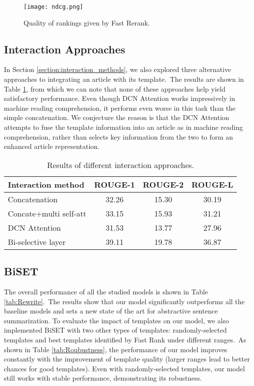 \documentclass[11pt,a4paper]{article}
\begin{document}
\begin{spacing}{1.0}
\begin{figure}
\centering
\texttt{[image: ndcg.png]}
\caption{Quality of rankings given by Fast Rerank.}
\label{img:ndcg}
\end{figure}


\subsection{Interaction Approaches}
In Section \ref{section:interaction_methods}, we also explored three alternative approaches to integrating an article with its template.~The results are shown in Table \ref{tab:Interaction}, from which we can note that none of these approaches help yield satisfactory performance. Even though DCN Attention works impressively in machine reading comprehension, it performs even worse in this task than the simple concatenation. We conjecture the reason is that the DCN Attention attempts to fuse the template information into an article as in machine reading comprehension, rather than  selects key information from the two to form an enhanced article representation.

\begin{table}[h]
\small

	\centering
	\begin{tabular}{@{}l|ccc@{}}
		\toprule
        Interaction method& ROUGE-1   & ROUGE-2  & ROUGE-L  \\
        \hline
        Concatenation  & 32.26 & 15.30 & 30.19 \\
        Concate+multi self-att  & 33.15 & 15.93 & 31.21 \\
        DCN Attention   & 31.53 & 13.77 & 27.96 \\
        Bi-selective layer &39.11 & 19.78 & 36.87 \\
        \bottomrule
	\end{tabular}
	\caption{Results of different interaction approaches.}
\label{tab:Interaction}
\end{table}

\subsection{BiSET}
The overall performance of all the studied models is shown in Table \ref{tab:Rewrite}.~The results show that our model significantly outperforms all the baseline models and sets a new state of the art for abstractive sentence summarization. To evaluate the impact of templates on our model, we also implemented BiSET with two other types of templates: randomly-selected templates and best templates identified by Fast Rank under different ranges.~As shown in Table \ref{tab:Roubustness}, the performance of our model improves constantly with the improvement of template quality (larger ranges lead to better chances for good templates). Even with randomly-selected templates, our model still works with stable performance, demonstrating its robustness.



\end{spacing}
\end{document}
